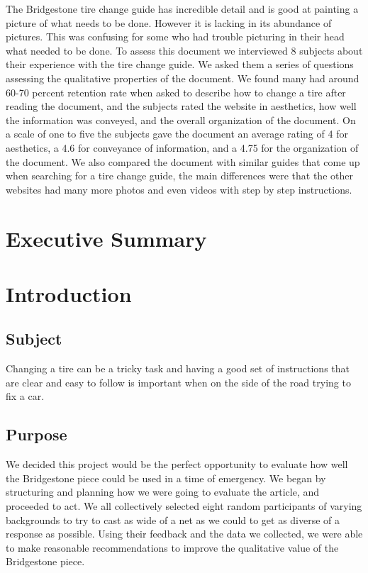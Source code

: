 \documentclass[12pt,A4paper]{article}
\begin{document}
	The Bridgestone tire change guide has incredible detail and is good at painting a picture of what needs to be done. However it is lacking in its abundance of pictures. This was confusing for some who had trouble picturing in their head what needed to be done. To assess this document we interviewed 8 subjects about their experience with the tire change guide. We asked them a series of questions assessing the qualitative properties of the document. We found many had around 60-70 percent retention rate when asked to describe how to change a tire after reading the document, and the subjects rated the website in aesthetics, how well the information was conveyed, and the overall organization of the document. On a scale of one to five the subjects gave the document an average rating of 4 for aesthetics, a 4.6 for conveyance of information, and a 4.75 for the organization of the document. We also compared the document with similar guides that come up when searching for a tire change guide, the main differences were that the other websites had many more photos and even videos with step by step instructions.
	
	\clearpage
	
	\setcounter{page}{2}
	
	\tableofcontents

	
	\renewcommand\listfigurename{List of Illustrations}
	\listoffigures

	\clearpage
	\section{Executive Summary}

	\section{Introduction}
	
		\subsection{Subject}
		Changing a tire can be a tricky task and having a good set of instructions that are clear and easy to follow is important when on the side of the road trying to fix a car.

		\subsection{Purpose}
		We decided this project would be the perfect opportunity to evaluate how well the Bridgestone piece could be used in a time of emergency. We began by structuring and planning how we were going to evaluate the article, and proceeded to act. We all collectively selected eight random participants of varying backgrounds to try to cast as wide of a net as we could to get as diverse of a response as possible. Using their feedback and the data we collected, we were able to make reasonable recommendations to improve the qualitative value of the Bridgestone piece.
\end{document}
